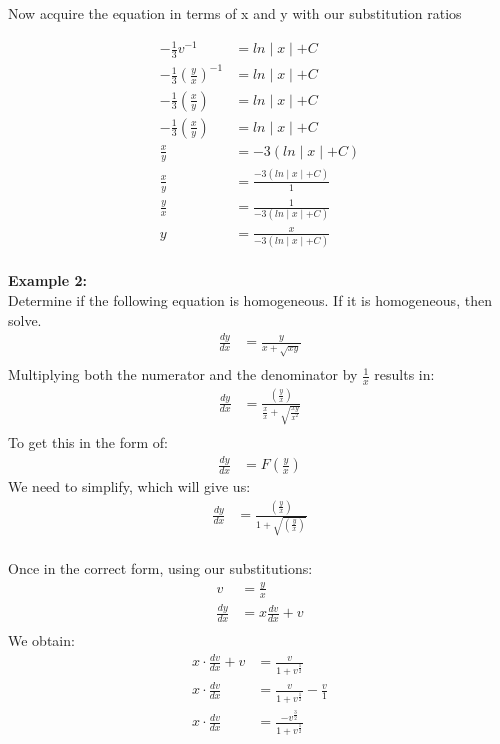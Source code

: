 \documentclass{article}
\begin{document}
\begin{flushleft}
{Now acquire the equation in terms of x and y with our substitution ratios

\begin{align*}
-\frac{1}{3}v^{-1} & = ln\mid x \mid + C \\
-\frac{1}{3}(\frac{y}{x})^{-1} & = ln\mid x \mid + C \\
-\frac{1}{3}(\frac{x}{y}) & = ln\mid x \mid + C \\
-\frac{1}{3}(\frac{x}{y}) & = ln\mid x \mid + C \\
\frac{x}{y} & = -3 (ln\mid x \mid + C) \\
\frac{x}{y} & = \frac{ -3 (ln\mid x \mid + C) }{1} \\
\frac{y}{x} & = \frac{1}{ -3 (ln\mid x \mid + C) } \\
y & =  \frac{x}{ -3 (ln\mid x \mid + C) } \\
\end{align*}


\textbf{Example 2:}\\
Determine if the following equation is homogeneous. If it is homogeneous, then solve.
\begin{align*}
\frac{dy}{dx} & = \frac{y}{x +\sqrt{xy}}\\
\end{align*}
Multiplying both the numerator and the denominator by $\frac{1}{x}$ results in:\\
\begin{align*}
\frac{dy}{dx} & = \frac{(\frac{y}{x})}{\frac{x}{x} +\sqrt{\frac{xy}{x^2}}}\\
\end{align*}
To get this in the form of:
\begin{align*}
\frac{dy}{dx} & = F (\frac{y}{x})
\end{align*}
We need to simplify, which will give us:\\
\begin{align*}
\frac{dy}{dx} & = \frac{(\frac{y}{x})}{1 +\sqrt{(\frac{y}{x})}}\\
\end{align*}

Once in the correct form, using our substitutions:\\
\begin{align*}
v & = \frac{y}{x}\\
\frac{dy}{dx} & = x \frac{dv}{dx} + v\\
 \end{align*}
We obtain:\\
\begin{align*}
x \cdot \frac{dv}{dx} + v & = \frac{v}{1 + v^\frac{1}{2}}\\
x \cdot  \frac{dv}{dx}  & = \frac{v}{1 + v^\frac{1}{2}} - \frac{v}{1}\\
x \cdot  \frac{dv}{dx}  & = \frac{-v^\frac{3}{2}}{1 + v^\frac{1}{2}}\\
\end{align*}

}
\end{flushleft}
\end{document}
